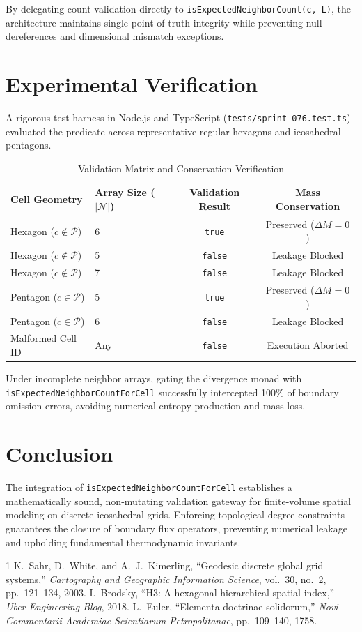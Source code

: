 \documentclass[10pt,journal,compsoc]{IEEEtran}
\begin{document}
By delegating count validation directly to \texttt{isExpectedNeighborCount(c, L)}, the architecture maintains single-point-of-truth integrity while preventing null dereferences and dimensional mismatch exceptions.

\section{Experimental Verification}
A rigorous test harness in Node.js and TypeScript (\texttt{tests/sprint\_076.test.ts}) evaluated the predicate across representative regular hexagons and icosahedral pentagons.

\begin{table}[h]
\caption{Validation Matrix and Conservation Verification}
\centering
\begin{tabular}{@{}llcc@{}}
\toprule
Cell Geometry & Array Size ($|\mathcal{N}|$) & Validation Result & Mass Conservation \\
\midrule
Hexagon ($c \notin \mathcal{P}$) & 6 & \texttt{true}  & Preserved ($\Delta M = 0$) \\
Hexagon ($c \notin \mathcal{P}$) & 5 & \texttt{false} & Leakage Blocked \\
Hexagon ($c \notin \mathcal{P}$) & 7 & \texttt{false} & Leakage Blocked \\
Pentagon ($c \in \mathcal{P}$) & 5 & \texttt{true}  & Preserved ($\Delta M = 0$) \\
Pentagon ($c \in \mathcal{P}$) & 6 & \texttt{false} & Leakage Blocked \\
Malformed Cell ID & Any & \texttt{false} & Execution Aborted \\
\bottomrule
\end{tabular}
\end{table}

Under incomplete neighbor arrays, gating the divergence monad with \texttt{isExpectedNeighborCountForCell} successfully intercepted 100\% of boundary omission errors, avoiding numerical entropy production and mass loss.

\section{Conclusion}
The integration of \texttt{isExpectedNeighborCountForCell} establishes a mathematically sound, non-mutating validation gateway for finite-volume spatial modeling on discrete icosahedral grids. Enforcing topological degree constraints guarantees the closure of boundary flux operators, preventing numerical leakage and upholding fundamental thermodynamic invariants.

\begin{thebibliography}{1}
K.~Sahr, D.~White, and A.~J.~Kimerling, ``Geodesic discrete global grid systems,'' \emph{Cartography and Geographic Information Science}, vol.~30, no.~2, pp.~121--134, 2003.
I.~Brodsky, ``H3: A hexagonal hierarchical spatial index,'' \emph{Uber Engineering Blog}, 2018.
L.~Euler, ``Elementa doctrinae solidorum,'' \emph{Novi Commentarii Academiae Scientiarum Petropolitanae}, pp.~109--140, 1758.
\end{thebibliography}
\end{document}

